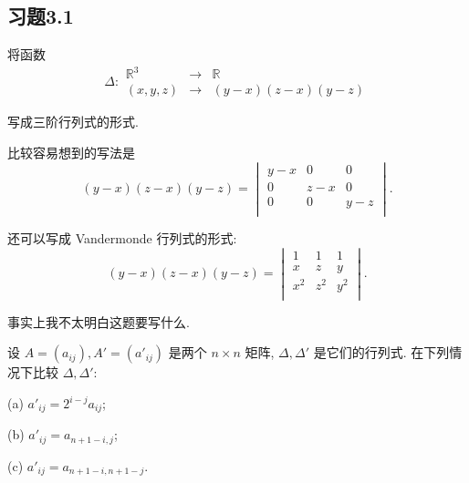 \documentclass{ctexart}
\begin{document}
\subsection{习题3.1}
\begin{exercise}%
    将函数
    \[\Delta:\begin{array}{rcl}
        \mathbb{R}^3 & \to & \mathbb{R} \\
        (x,y,z) & \to & (y-x)(z-x)(y-z)
    \end{array}\]

    写成三阶行列式的形式.
\end{exercise}
\begin{solution}
    比较容易想到的写法是
    \[(y-x)(z-x)(y-z)=\begin{vmatrix}
        y-x & 0 & 0 \\
        0 & z-x & 0 \\
        0 & 0 & y-z \\
    \end{vmatrix}.\]

    还可以写成 Vandermonde 行列式的形式:
    \[(y-x)(z-x)(y-z)=\begin{vmatrix}
        1 & 1 & 1 \\
        x & z & y \\
        x^2 & z^2 & y^2 \\
    \end{vmatrix}.\]
\end{solution}
\begin{note}
    事实上我不太明白这题要写什么.
\end{note}
\begin{exercise}%
    设 $A=(a_{ij}),A'=(a'_{ij})$ 是两个 $n\times n$ 矩阵, $\Delta,\Delta'$ 是它们的行列式. 在下列情况下比较 $\Delta,\Delta'$:

    (a) $a'_{ij}=2^{i-j}a_{ij}$;

    (b) $a'_{ij}=a_{n+1-i,j}$;

    (c) $a'_{ij}=a_{n+1-i,n+1-j}$.
\end{exercise}
\end{document}
